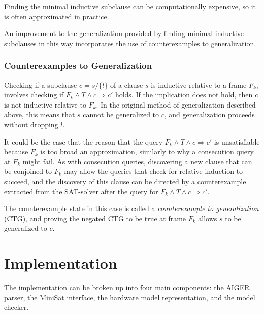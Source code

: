 \documentclass[12pt,a4paper,twoside,openright]{report}
\begin{document}
\begin{algorithm}[H]
\DontPrintSemicolon
{}
\end{algorithm}

Finding the minimal inductive subclause can be computationally
expensive, so it is often approximated in practice.

An improvement to the generalization provided by finding minimal
inductive subclauses in this way incorporates the use of counterexamples
to generalization.

\subsection{Counterexamples to Generalization}

Checking if a subclause $c = s / \{l\}$ of a clause $s$ is inductive
relative to a frame $F_k$, involves checking if
$F_k \wedge T \wedge c \Rightarrow c'$ holds.
If the implication does not hold, then $c$ is not inductive relative to
$F_k$. In the original method of generalization described above,
this means that $s$ cannot be generalized to $c$, and generalization
proceeds without dropping $l$.

It could be the case that the reason that the query
$F_k \wedge T \wedge c \Rightarrow c'$ is unsatisfiable because
$F_k$ is too broad an approximation, similarly to why a consecution
query at $F_k$ might fail. As with consecution queries, discovering a
new clause that can be conjoined to $F_k$ may allow the queries that
check for relative induction to succeed, and the discovery of this
clause can be directed by a counterexample extracted from the
SAT-solver after the query for $F_k \wedge T \wedge c \Rightarrow c'$.

The counterexample state in this case is called a \emph{counterexample
to generalization} (CTG), and proving the negated CTG to be true at
frame $F_k$ allows $s$ to be generalized to $c$.


\chapter{Implementation}

The implementation can be broken up into four main components: the AIGER parser, the
MiniSat interface, the hardware model representation, and the model checker.
\end{document}
